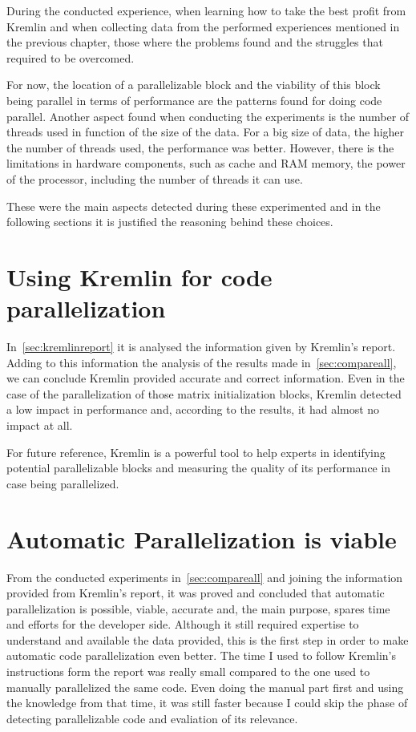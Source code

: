 During the conducted experience, when learning how to take the best profit from Kremlin and when collecting data from the performed experiences mentioned in the previous chapter, those where the problems found and the struggles that required to be overcomed.

For now, the location of a parallelizable block and the viability of this block being parallel in terms of performance are the patterns found for doing code parallel. Another aspect found when conducting the experiments is the number of threads used in function of the size of the data. For a big size of data, the higher the number of threads used, the performance was better. However, there is the limitations in hardware components, such as cache and RAM memory, the power of the processor, including the number of threads it can use.

These were the main aspects detected during these experimented and in the following sections it is justified the reasoning behind these choices.

\section{Using Kremlin for code parallelization}

In~\ref{sec:kremlinreport} it is analysed the information given by Kremlin's report. Adding to this information the analysis of the results made in~\ref{sec:compareall}, we can conclude Kremlin provided accurate and correct information. Even in the case of the parallelization of those matrix initialization blocks, Kremlin detected a low impact in performance and, according to the results, it had almost no impact at all.


For future reference, Kremlin is a powerful tool to help experts in identifying potential parallelizable blocks and measuring the quality of its performance in case being parallelized.  

\section{Automatic Parallelization is viable}

From the conducted experiments in~\ref{sec:compareall} and joining the information provided from Kremlin's report, it was proved and concluded that automatic parallelization is possible, viable, accurate and, the main purpose, spares time and efforts for the developer side. Although it still required expertise to understand and available the data provided, this is the first step in order to make automatic code parallelization even better. The time I used to follow Kremlin's instructions form the report was really small compared to the one used to manually parallelized the same code. Even doing the manual part first and using the knowledge from that time, it was still faster because I could skip the phase of detecting parallelizable code and evaliation of its relevance.

